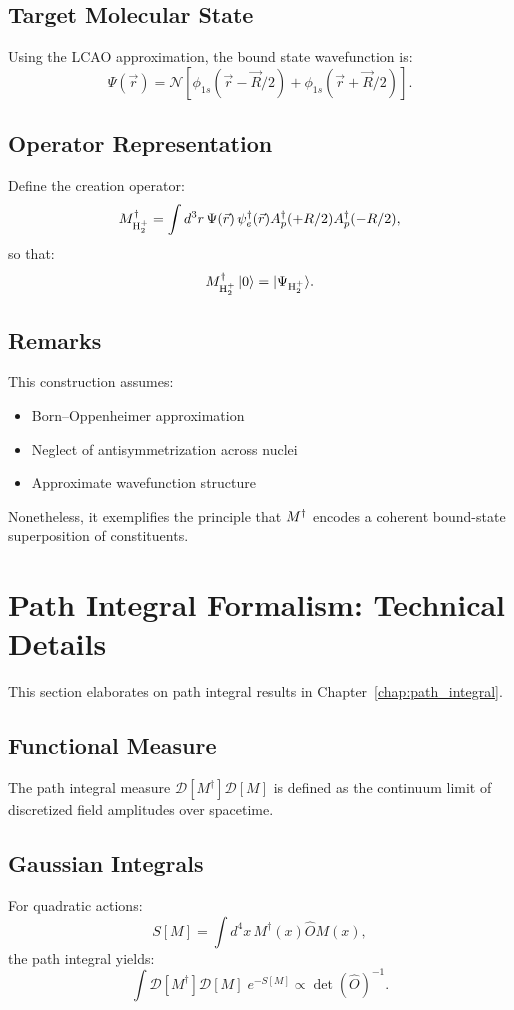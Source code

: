 \subsection*{Target Molecular State}
Using the LCAO approximation, the bound state wavefunction is:
\[
\Psi(\vec{r}) = \mathcal{N} \left[ \phi_{1s}(\vec{r} - \vec{R}/2) + \phi_{1s}(\vec{r} + \vec{R}/2) \right].
\]

\subsection*{Operator Representation}
Define the creation operator:
\[
M^\dagger_{\mathrm{H}_2^+} = \int d^3 r\, \Psi(\vec{r})\, \psi^\dagger_e(\vec{r}) A^\dagger_p(+R/2) A^\dagger_p(-R/2),
\]
so that:
\[
M^\dagger_{\mathrm{H}_2^+} \ket{0} = |\Psi_{\mathrm{H}_2^+} \rangle.
\]

\subsection*{Remarks}
This construction assumes:
\begin{itemize}
  \item Born--Oppenheimer approximation
  \item Neglect of antisymmetrization across nuclei
  \item Approximate wavefunction structure
\end{itemize}

Nonetheless, it exemplifies the principle that \( M^\dagger_{} \) encodes a coherent bound-state superposition of constituents.

\section{Path Integral Formalism: Technical Details}
\label{app:sec:pi_details}

This section elaborates on path integral results in Chapter~\ref{chap:path_integral}.

\subsection{Functional Measure}
The path integral measure \( \mathcal{D}[M^\dagger] \mathcal{D}[M] \) is defined as the continuum limit of discretized field amplitudes over spacetime.

\subsection{Gaussian Integrals}
For quadratic actions:
\[
S[M] = \int d^4x\, M^\dagger(x) \hat{O} M(x),
\]
the path integral yields:
\[
\int \mathcal{D}[M^\dagger] \mathcal{D}[M] \; e^{-S[M]} \propto \det(\hat{O})^{-1}.
\]

